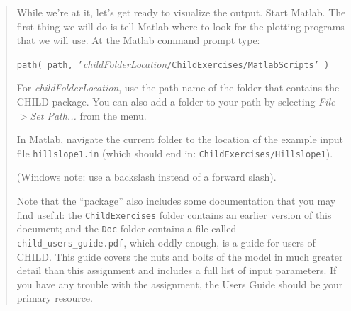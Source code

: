 \documentclass[12pt,reqno]{amsart}
\begin{document}
\begin{quote}
{While we're at it, let's get ready to visualize the output. Start Matlab. The first thing we will do is tell Matlab where to look for the plotting programs that we will use. At the Matlab command prompt type:

{\tt path( path, '}{\em childFolderLocation}{\tt /ChildExercises/MatlabScripts' )}

\noindent 
For {\em childFolderLocation}, use the path name of the folder that contains the CHILD package. You can also add a folder to your path by selecting {\em File-$>$Set Path...} from the menu.

In Matlab, navigate the current folder to the location of the example input file {\tt hillslope1.in} (which should end in: {\tt ChildExercises/Hillslope1}).

(Windows note: use a backslash instead of a forward slash).

Note that the ``package'' also includes some documentation that you
may find useful: the {\tt ChildExercises} folder contains an earlier
version of this document; and the {\tt Doc} folder contains a file
called {\tt child\_users\_guide.pdf}, which oddly enough, is a guide
for users of CHILD. This guide covers the nuts and bolts of the model
in much greater detail than this assignment and includes a full list of
input parameters. If you have any trouble with the assignment, the
Users Guide should be your primary resource.
}
\end{quote}
\end{document}
